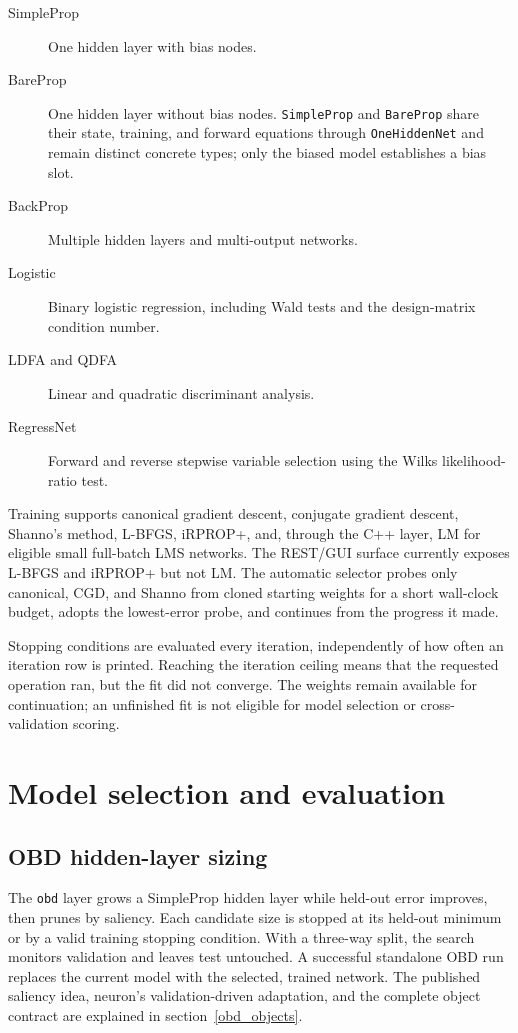 \begin{description}
\item[SimpleProp] One hidden layer with bias nodes.
\item[BareProp] One hidden layer without bias nodes.  \texttt{SimpleProp}
and \texttt{BareProp} share their state, training, and forward equations
through \texttt{OneHiddenNet} and remain distinct concrete types; only
the biased model establishes a bias slot.
\item[BackProp] Multiple hidden layers and multi-output networks.
\item[Logistic] Binary logistic regression, including Wald tests and
the design-matrix condition number.
\item[LDFA and QDFA] Linear and quadratic discriminant analysis.
\item[RegressNet] Forward and reverse stepwise variable selection
using the Wilks likelihood-ratio test.
\end{description}

Training supports canonical gradient descent, conjugate gradient descent,
Shanno's method, L-BFGS, iRPROP+, and, through the C++ layer, LM for eligible
small full-batch LMS networks.  The REST/GUI surface currently exposes L-BFGS
and iRPROP+ but not LM.  The automatic selector probes only canonical, CGD, and
Shanno from cloned starting weights for a short wall-clock budget, adopts the
lowest-error probe, and continues from the progress it made.

Stopping conditions are evaluated every iteration, independently of
how often an iteration row is printed.  Reaching the iteration ceiling
means that the requested operation ran, but the fit did not converge.
The weights remain available for continuation; an unfinished fit is
not eligible for model selection or cross-validation scoring.

\section{Model selection and evaluation}

\subsection{OBD hidden-layer sizing}

The \texttt{obd} layer grows a SimpleProp hidden layer while held-out
error improves, then prunes by saliency.  Each candidate size is
stopped at its held-out minimum or by a valid training stopping
condition.  With a three-way split, the search monitors validation and
leaves test untouched.  A successful standalone OBD run replaces the
current model with the selected, trained network.
The published saliency idea, neuron's validation-driven adaptation, and the
complete object contract are explained in section~\ref{obd_objects}.

